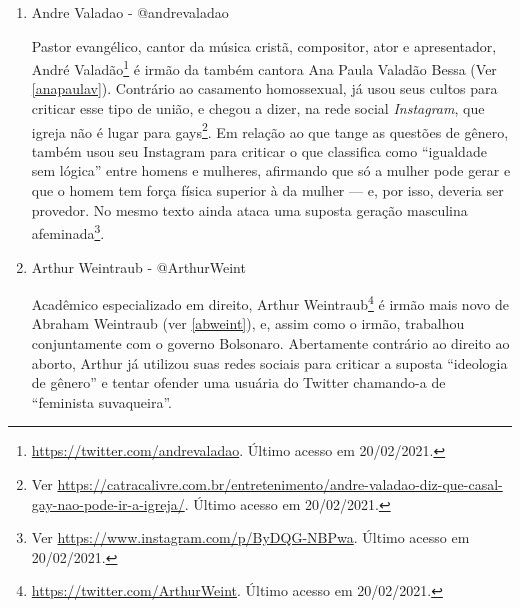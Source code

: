 \documentclass[
	12pt,				%
	openright,			%
	twoside,			%
	a4paper,			%
	english,			%
	brazil				%
	]{abntex2}
\begin{document}
\begin{anexosenv}
\begin{enumerate}
 
 \item Andre Valadao - @andrevaladao
 
 Pastor evangélico, cantor da música cristã, compositor, ator e apresentador, André Valadão\footnote{\url{https://twitter.com/andrevaladao}. Último acesso em 20/02/2021.} é irmão da também cantora Ana Paula Valadão Bessa (Ver \ref{anapaulav}). Contrário ao casamento homossexual, já usou seus cultos para criticar esse tipo de união, e chegou a dizer, na rede social \textit{Instagram}, que igreja não é lugar para gays\footnote{Ver \url{https://catracalivre.com.br/entretenimento/andre-valadao-diz-que-casal-gay-nao-pode-ir-a-igreja/}. Último acesso em 20/02/2021.}. Em relação ao que tange as questões de gênero, também usou seu Instagram para criticar o que classifica como ``igualdade sem lógica'' entre homens e mulheres, afirmando que só a mulher pode gerar e que o homem tem força física superior à da mulher --- e, por isso, deveria ser provedor. No mesmo texto ainda ataca uma suposta geração masculina afeminada\footnote{Ver \url{https://www.instagram.com/p/ByDQG-NBPwa}. Último acesso em 20/02/2021.}.

 \item Arthur Weintraub - @ArthurWeint
 
 Acadêmico especializado em direito, Arthur Weintraub\footnote{\url{https://twitter.com/ArthurWeint}. Último acesso em 20/02/2021.} é irmão mais novo de Abraham Weintraub (ver \ref{abweint}), e, assim como o irmão, trabalhou conjuntamente com o governo Bolsonaro. Abertamente contrário ao direito ao aborto, Arthur já utilizou suas redes sociais para criticar a suposta ``ideologia de gênero'' e tentar ofender uma usuária do Twitter chamando-a de ``feminista suvaqueira''.
 
 

\end{enumerate}
\end{anexosenv}
\end{document}
